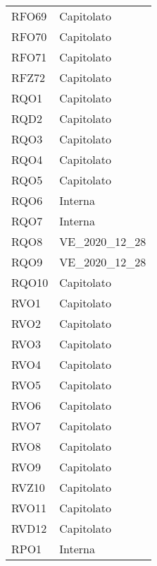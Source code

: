 \begin{longtable}{|C{6cm} C{3cm}|}
    RFO69 & Capitolato \\
    
    RFO70 & Capitolato \\
    
    RFO71 & Capitolato \\
    
    RFZ72 & Capitolato \\
    
	RQO1 & Capitolato \\
	
	RQD2 & Capitolato \\
	
	RQO3 & Capitolato \\
	
	RQO4 & Capitolato \\

	RQO5 & Capitolato \\

	RQO6 & Interna \\

	RQO7 & Interna  \\
	
	RQO8 & VE\_2020\_12\_28 \\
	
	RQO9 & VE\_2020\_12\_28 \\
	
	RQO10 & Capitolato \\
	
	RVO1 & Capitolato \\
	
	RVO2 & Capitolato \\
	
	RVO3 & Capitolato \\
	
	RVO4 & Capitolato \\
	
	RVO5 & Capitolato \\
	
	RVO6 & Capitolato \\
	
	RVO7 & Capitolato \\
	
	RVO8 & Capitolato \\
	
	RVO9 & Capitolato \\
	
	RVZ10 & Capitolato \\
	
	RVO11 & Capitolato \\
	
	RVD12 & Capitolato \\
	
    RPO1 & Interna \\
\end{longtable}
